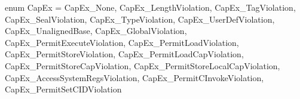 enum CapEx = {
  CapEx_None,
  CapEx_LengthViolation,
  CapEx_TagViolation,
  CapEx_SealViolation,
  CapEx_TypeViolation,
  CapEx_UserDefViolation,
  CapEx_UnalignedBase,
  CapEx_GlobalViolation,
  CapEx_PermitExecuteViolation,
  CapEx_PermitLoadViolation,
  CapEx_PermitStoreViolation,
  CapEx_PermitLoadCapViolation,
  CapEx_PermitStoreCapViolation,
  CapEx_PermitStoreLocalCapViolation,
  CapEx_AccessSystemRegsViolation,
  CapEx_PermitCInvokeViolation,
  CapEx_PermitSetCIDViolation
}
